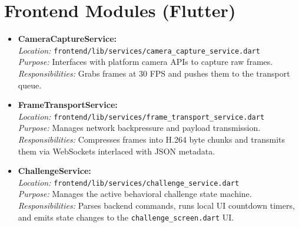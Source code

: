 \documentclass[12pt, a4paper]{report}
\begin{document}
\section{Frontend Modules (Flutter)}
\begin{itemize}
    \item \textbf{CameraCaptureService:} \\
    \textit{Location:} \texttt{frontend/lib/services/camera\_capture\_service.dart} \\
    \textit{Purpose:} Interfaces with platform camera APIs to capture raw frames. \\
    \textit{Responsibilities:} Grabs frames at 30 FPS and pushes them to the transport queue.
    
    \item \textbf{FrameTransportService:} \\
    \textit{Location:} \texttt{frontend/lib/services/frame\_transport\_service.dart} \\
    \textit{Purpose:} Manages network backpressure and payload transmission. \\
    \textit{Responsibilities:} Compresses frames into H.264 byte chunks and transmits them via WebSockets interlaced with JSON metadata.
    
    \item \textbf{ChallengeService:} \\
    \textit{Location:} \texttt{frontend/lib/services/challenge\_service.dart} \\
    \textit{Purpose:} Manages the active behavioral challenge state machine. \\
    \textit{Responsibilities:} Parses backend commands, runs local UI countdown timers, and emits state changes to the \texttt{challenge\_screen.dart} UI.
\end{itemize}
\end{document}

